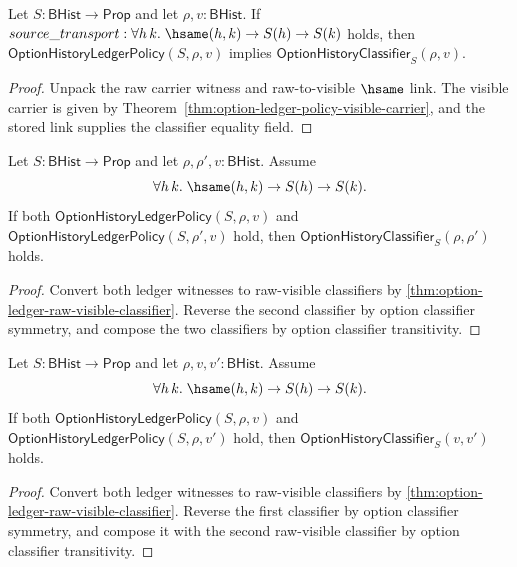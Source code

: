 \begin{theorem}
\label{thm:option-ledger-raw-visible-classifier}
Let $S:\mathsf{BHist}\to\mathsf{Prop}$ and let $\rho,v:\mathsf{BHist}$. If
$source\_transport : \forall h\,k.\;\hsame(h,k)\to S(h)\to S(k)$ holds, then
$\mathsf{OptionHistoryLedgerPolicy}(S,\rho,v)$ implies
$\mathsf{OptionHistoryClassifier}_S(\rho,v)$.
\end{theorem}
\begin{proof}
Unpack the raw carrier witness and raw-to-visible $\hsame$ link. The visible carrier is given by Theorem~\ref{thm:option-ledger-policy-visible-carrier}, and the stored link supplies the classifier equality field.
\end{proof}

\begin{theorem}
\label{thm:option-ledger-shared-visible-raw-classifier}
Let $S:\mathsf{BHist}\to\mathsf{Prop}$ and let $\rho,\rho',v:\mathsf{BHist}$.
Assume
$$
  \forall h\,k.\;\hsame(h,k)\to S(h)\to S(k).
$$
If both $\mathsf{OptionHistoryLedgerPolicy}(S,\rho,v)$ and
$\mathsf{OptionHistoryLedgerPolicy}(S,\rho',v)$ hold, then
$\mathsf{OptionHistoryClassifier}_S(\rho,\rho')$ holds.
\end{theorem}
\begin{proof}
Convert both ledger witnesses to raw-visible classifiers by
\autoref{thm:option-ledger-raw-visible-classifier}. Reverse the second
classifier by option classifier symmetry, and compose the two classifiers by
option classifier transitivity.
\end{proof}

\begin{theorem}
\label{thm:option-history-ledger-policy-shared-raw-visible-classifier}
Let $S:\mathsf{BHist}\to\mathsf{Prop}$ and let $\rho,v,v':\mathsf{BHist}$.
Assume
$$
  \forall h\,k.\;\hsame(h,k)\to S(h)\to S(k).
$$
If both $\mathsf{OptionHistoryLedgerPolicy}(S,\rho,v)$ and
$\mathsf{OptionHistoryLedgerPolicy}(S,\rho,v')$ hold, then
$\mathsf{OptionHistoryClassifier}_S(v,v')$ holds.
\end{theorem}
\begin{proof}
Convert both ledger witnesses to raw-visible classifiers by
\autoref{thm:option-ledger-raw-visible-classifier}. Reverse the first
classifier by option classifier symmetry, and compose it with the second
raw-visible classifier by option classifier transitivity.
\end{proof}

